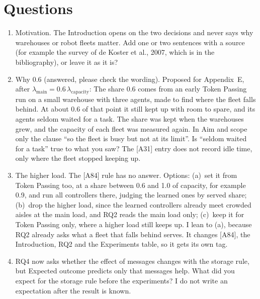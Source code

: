 \documentclass[11pt,a4paper]{article}
\newcommand{\new}[1]{\textcolor{newc}{#1}}
\begin{document}
\section*{Questions}
\begin{enumerate}[nosep]
  \item Motivation. The Introduction opens on the two decisions and never
    says why warehouses or robot fleets matter. Add one or two sentences
    with a source (for example the survey of de Koster et al., 2007, which
    is in the bibliography), or leave it as it is?
  \item Why 0.6 (answered, please check the wording). Proposed for
    Appendix~E, after $\lambda_{\mathrm{main}} = 0.6\,\lambda_{\mathrm{capacity}}$:
    \new{The share 0.6 comes from an early Token Passing run on a small
    warehouse with three agents, made to find where the fleet falls behind.
    At about 0.6 of that point it still kept up with room to spare, and its
    agents seldom waited for a task. The share was kept when the warehouses
    grew, and the capacity of each fleet was measured again.} In Aim and
    scope only the clause ``so the fleet is busy but not at its limit''.
    Is ``seldom waited for a task'' true to what you saw? The [A31] entry
    does not record idle time, only where the fleet stopped keeping up.
  \item The higher load. The [A84] rule has no answer. Options:
    (a)~set it from Token Passing too, at a share between 0.6 and 1.0 of
    capacity, for example 0.9, and run all controllers there, judging the
    learned ones by served share; (b)~drop the higher load, since the
    learned controllers already meet crowded aisles at the main load, and
    RQ2 reads the main load only; (c)~keep it for Token Passing only, where
    a higher load still keeps up. I lean to (a), because RQ2 already asks
    what a fleet that falls behind serves. It changes [A84], the
    Introduction, RQ2 and the Experiments table, so it gets its own tag.
  \item RQ4 now asks whether the effect of messages changes with the storage
    rule, but Expected outcome predicts only that messages help. What did
    you expect for the storage rule before the experiments? I do not write
    an expectation after the result is known.
\end{enumerate}
\end{document}
